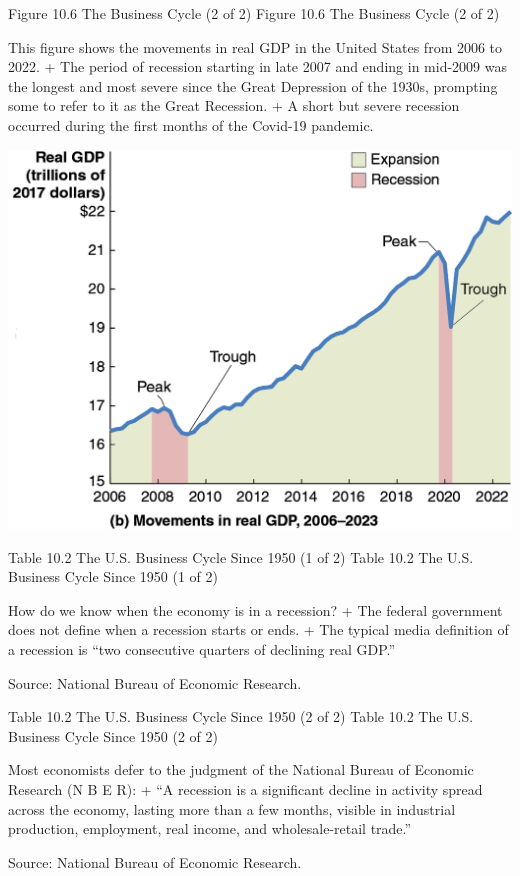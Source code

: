 \documentclass[
  12pt,
  ignorenonframetext,
]{beamer}
\begin{document}
\begin{frame}{Figure 10.6 The Business Cycle (2 of 2)}
\label{figure-10.6-the-business-cycle-2-of-2}
Figure 10.6 The Business Cycle (2 of 2)

This figure shows the movements in real GDP in the United States from
2006 to 2022. + The period of recession starting in late 2007 and ending
in mid-2009 was the longest and most severe since the Great Depression
of the 1930s, prompting some to refer to it as the Great Recession. + A
short but severe recession occurred during the first months of the
Covid-19 pandemic.

\includegraphics[width=\textwidth,height=0.99\textheight]{imgs3/img_slide35a.png}
\end{frame}

\begin{frame}{Table 10.2 The U.S. Business Cycle Since 1950 (1 of 2)}
\label{table-10.2-the-u.s.-business-cycle-since-1950-1-of-2}
Table 10.2 The U.S. Business Cycle Since 1950 (1 of 2)

How do we know when the economy is in a recession? + The federal
government does not define when a recession starts or ends. + The
typical media definition of a recession is ``two consecutive quarters of
declining real GDP.''

Source: National Bureau of Economic Research.
\end{frame}

\begin{frame}{Table 10.2 The U.S. Business Cycle Since 1950 (2 of 2)}
\label{table-10.2-the-u.s.-business-cycle-since-1950-2-of-2}
Table 10.2 The U.S. Business Cycle Since 1950 (2 of 2)

Most economists defer to the judgment of the National Bureau of Economic
Research (N B E R): + ``A recession is a significant decline in activity
spread across the economy, lasting more than a few months, visible in
industrial production, employment, real income, and wholesale-retail
trade.''

Source: National Bureau of Economic Research.
\end{frame}
\end{document}
